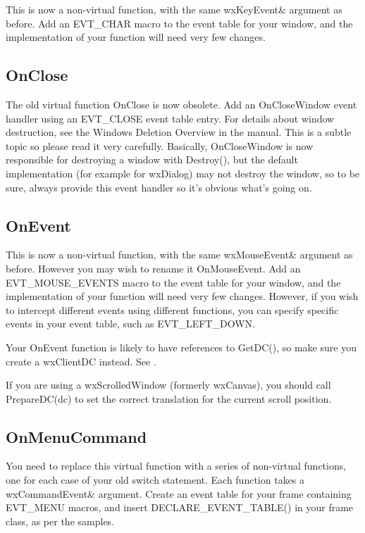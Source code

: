 This is now a non-virtual function, with the same wxKeyEvent\& argument as before.
Add an EVT\_CHAR macro to the event table
for your window, and the implementation of your function will need very few changes.

\subsection{OnClose}

The old virtual function OnClose is now obsolete.
Add an OnCloseWindow event handler using an EVT\_CLOSE event table entry. For details
about window destruction, see the Windows Deletion Overview in the manual. This is a subtle
topic so please read it very carefully. Basically, OnCloseWindow is now responsible for
destroying a window with Destroy(), but the default implementation (for example for wxDialog) may not
destroy the window, so to be sure, always provide this event handler so it's obvious what's going on.

\subsection{OnEvent}

This is now a non-virtual function, with the same wxMouseEvent\& argument as before. However
you may wish to rename it OnMouseEvent. Add an EVT\_MOUSE\_EVENTS macro to the event table
for your window, and the implementation of your function will need very few changes.
However, if you wish to intercept different events using different functions, you can
specify specific events in your event table, such as EVT\_LEFT\_DOWN.

Your OnEvent function is likely to have references to GetDC(), so make sure you create
a wxClientDC instead. See .

If you are using a wxScrolledWindow (formerly wxCanvas), you should call
PrepareDC(dc) to set the correct translation for the current scroll position.

\subsection{OnMenuCommand}

You need to replace this virtual function with a series of non-virtual functions, one for
each case of your old switch statement. Each function takes a wxCommandEvent\& argument.
Create an event table for your frame
containing EVT\_MENU macros, and insert DECLARE\_EVENT\_TABLE() in your frame class, as
per the samples.

